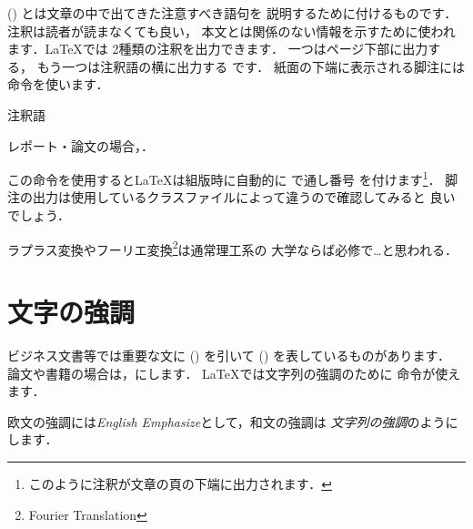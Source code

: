 %
 () とは文章の中で出てきた注意すべき語句を
説明するために付けるものです．注釈は読者が読まなくても良い，
本文とは関係のない情報を示すために使われます．{\LaTeX}では
2種類の注釈を出力できます．
%
一つはページ下部に出力する，
もう一つは注釈語の横に出力する%
です．
紙面の下端に表示される脚注には  命令を使います．
\begin{Syntax}
注釈語
\end{Syntax}
レポート・論文の場合，．

この命令を使用すると{\LaTeX}は組版時に自動的に  で通し番号
を付けます\footnote{このように注釈が文章の頁の下端に出力されます．}．
脚注の出力は使用しているクラスファイルによって違うので確認してみると
良いでしょう．
\begin{InOut}
ラプラス変換やフーリエ変換\footnote
{Fourier Translation}は通常理工系の
大学ならば必修で\ldots と思われる．
\end{InOut}




\section{文字の強調}

ビジネス文書等では重要な文に () を引いて
 () を表しているものがあります．
論文や書籍の場合は，にします．
%
{\LaTeX}では文字列の強調のために  命令が使えます．
\begin{InOut}
欧文の強調には\emph{English 
Emphasize}として，和文の強調は
\emph{文字列の強調}のようにします．
\end{InOut}


